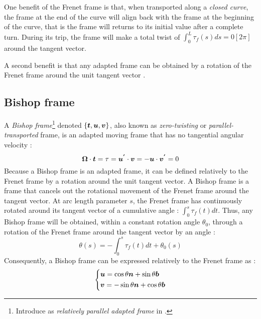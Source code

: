 One benefit of the Frenet frame is that, when transported along a \emph{closed curve}, the frame at the end of the curve will align back with the frame at the beginning of the curve, that is the frame will returns to its initial value after a complete turn. During its trip, the frame will make a total twist of $\int_0^L \tau_f(s)ds = 0[2\pi]$ around the tangent vector.

A second benefit is that any adapted frame can be obtained by a rotation of the Frenet frame around the unit tangent vector \cite[p.2]{Guggenheimer1989}.

\subsection{Bishop frame}\label{sec:bishop}

A \emph{Bishop frame}\footnote{Introduce as \emph{relatively parallel adapted frame} in \cite{Bishop1975}.} denoted $\{\boldsymbol{t},\boldsymbol{u},\boldsymbol{v}\}$, also known as \emph{zero-twisting} or \emph{parallel-transported} frame, is an adapted moving frame that has no tangential angular velocity :
\begin{equation}
	\boldsymbol{\Omega} \cdot \boldsymbol{t} = \tau =\boldsymbol{u^{'}} \cdot \boldsymbol{v} = - \boldsymbol{u} \cdot \boldsymbol{v^{'}} = 0
\end{equation}
Because a Bishop frame is an adapted frame, it can be defined relatively to the Frenet frame by a rotation around the unit tangent vector. A Bishop frame is a frame that cancels out the rotational movement of the Frenet frame around the tangent vector. At arc length parameter $s$, the Frenet frame has continuously rotated around its tangent vector of a cumulative angle : $\int_0^s \tau_f(t)dt$. Thus, any Bishop frame will be obtained, within a constant rotation angle $\theta_0$, through a rotation of the Frenet frame around the tangent vector by an angle :
\begin{equation}
	\theta(s)  =  - \int_0^s \tau_f(t)dt + \theta_0(s)
\end{equation}
Consequently, a Bishop frame can be expressed relatively to the Frenet frame as :
\begin{equation}
	\left\{
	\begin{aligned}
		&\boldsymbol{u} = \cos \theta \boldsymbol{n} +  \sin \theta \boldsymbol{b}\\
		&\boldsymbol{v} = -\sin \theta \boldsymbol{n} +  \cos \theta \boldsymbol{b}
	\end{aligned}
	\right.
\end{equation}
